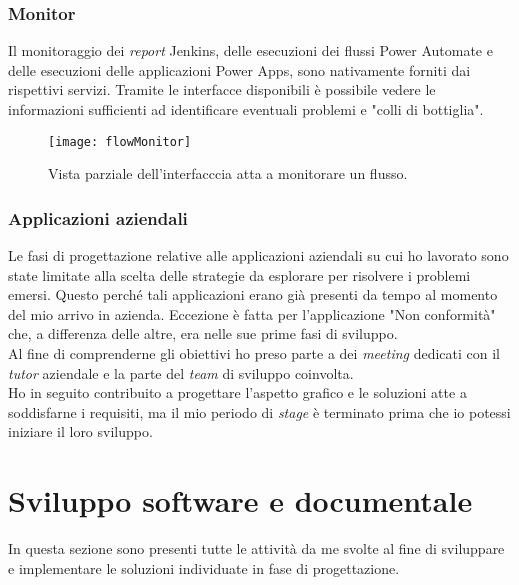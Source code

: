 \subsubsection*{Monitor}
Il monitoraggio dei \emph{report} Jenkins, delle esecuzioni dei flussi Power Automate e delle esecuzioni delle applicazioni Power Apps, sono nativamente forniti dai rispettivi servizi. Tramite le interfacce disponibili è possibile vedere le informazioni sufficienti ad identificare eventuali problemi e "colli di bottiglia".
\begin{figure}[htbp] 
    \centering 
    \texttt{[image: flowMonitor]} 
    \caption{Vista parziale dell'interfacccia atta a monitorare un flusso.}
    \label{fig:flowMonitor}
\end{figure}

\newpage \subsubsection*{Applicazioni aziendali} 
Le fasi di progettazione relative alle applicazioni aziendali su cui ho lavorato sono state limitate alla scelta delle strategie da esplorare per risolvere i problemi emersi. Questo perché tali applicazioni erano già presenti da tempo al momento del mio arrivo in azienda.
Eccezione è fatta per l'applicazione "Non conformità" che, a differenza delle altre, era nelle sue prime fasi di sviluppo.\\
Al fine di comprenderne gli obiettivi ho preso parte a dei \emph{meeting} dedicati con il \emph{\emph{tutor}} aziendale e la parte del \emph{team} di sviluppo coinvolta.\\ 
Ho in seguito contribuito a progettare l'aspetto grafico e le soluzioni atte a soddisfarne i requisiti, ma il mio periodo di \emph{stage} è terminato prima che io potessi iniziare il loro sviluppo.  

\section{Sviluppo software e documentale}
In questa sezione sono presenti tutte le attività da me svolte al fine di sviluppare e implementare le soluzioni individuate in fase di progettazione.
